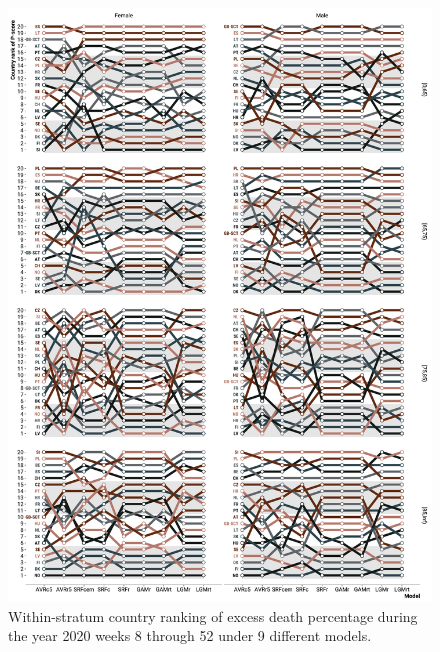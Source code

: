 \documentclass[12pt]{article}
\begin{document}
\begin{appendix}
\begin{figure}
\caption{Within-stratum country ranking of excess death percentage during the year 2020 weeks 8 through 52 under 9 different models.}
\label{fig:rankstrata}
\vspace{-1em}\includegraphics{rank_strata.pdf}
\end{figure}



\end{appendix}
\end{document}
